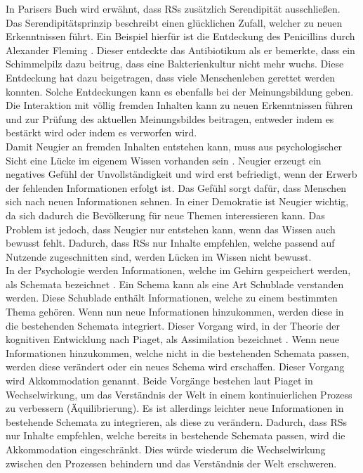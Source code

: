In Parisers Buch wird erwähnt, dass \acp{RS} zusätzlich Serendipität ausschließen.
Das Serendipitätsprinzip beschreibt einen \glqq glücklichen\grqq{} Zufall, welcher zu neuen Erkenntnissen führt.
Ein Beispiel hierfür ist die Entdeckung des Penicillins durch Alexander Fleming \cite{penicilin}.
Dieser entdeckte das Antibiotikum als er bemerkte, dass ein Schimmelpilz dazu beitrug, dass eine Bakterienkultur nicht mehr wuchs.
Diese Entdeckung hat dazu beigetragen, dass viele Menschenleben gerettet werden konnten.
Solche Entdeckungen kann es ebenfalls bei der Meinungsbildung geben.
Die Interaktion mit völlig fremden Inhalten kann zu neuen Erkenntnissen führen und zur Prüfung des aktuellen Meinungsbildes beitragen, entweder indem es bestärkt wird oder indem es verworfen wird. \\

Damit Neugier an fremden Inhalten entstehen kann, muss aus psychologischer Sicht eine Lücke im eigenem Wissen vorhanden sein \cite{handbook-emotion-curiosity}.
Neugier erzeugt ein negatives Gefühl der Unvollständigkeit und wird erst befriedigt, wenn der Erwerb der fehlenden Informationen erfolgt ist.
Das Gefühl sorgt dafür, dass Menschen sich nach neuen Informationen sehnen.
In einer Demokratie ist Neugier wichtig, da sich dadurch die Bevölkerung für neue Themen interessieren kann.
Das Problem ist jedoch, dass Neugier nur entstehen kann, wenn das Wissen auch bewusst fehlt.
Dadurch, dass \acp{RS} nur Inhalte empfehlen, welche passend auf Nutzende zugeschnitten sind, werden Lücken im Wissen nicht bewusst. \\

In der Psychologie werden Informationen, welche im Gehirn gespeichert werden, als Schemata bezeichnet \cite{schema}.
Ein Schema kann als eine Art Schublade verstanden werden.
Diese Schublade enthält Informationen, welche zu einem bestimmten Thema gehören.
Wenn nun neue Informationen hinzukommen, werden diese in die bestehenden Schemata integriert.
Dieser Vorgang wird, in der Theorie der kognitiven Entwicklung nach Piaget, als Assimilation bezeichnet \cite{piaget}.
Wenn neue Informationen hinzukommen, welche nicht in die bestehenden Schemata passen, werden diese verändert oder ein neues Schema wird erschaffen.
Dieser Vorgang wird Akkommodation genannt.
Beide Vorgänge bestehen laut Piaget in Wechselwirkung, um das Verständnis der Welt in einem kontinuierlichen Prozess zu verbessern (Äquilibrierung).
Es ist allerdings leichter neue Informationen in bestehende Schemata zu integrieren, als diese zu verändern.
Dadurch, dass \acp{RS} nur Inhalte empfehlen, welche bereits in bestehende Schemata passen, wird die Akkommodation eingeschränkt.
Dies würde wiederum die Wechselwirkung zwischen den Prozessen behindern und das Verständnis der Welt erschweren. \\

